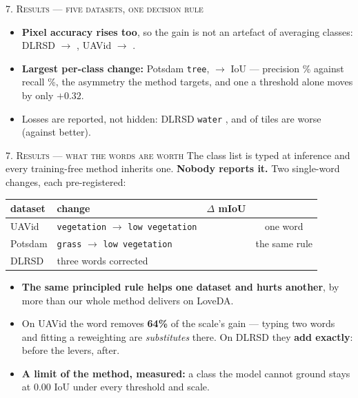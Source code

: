 \documentclass[aspectratio=169]{beamer}
\newcommand{\best}[1]{\textcolor{acc}{\textbf{#1}}}
\newcommand{\bad}[1]{\textcolor{warn}{#1}}
\begin{document}
\begin{frame}{\textsc{7. Results --- five datasets, one decision rule}}
\begin{itemize}
  \item \textbf{Pixel accuracy rises too}, so the gain is not an artefact of
        averaging classes: DLRSD \dlraAccA{} $\rightarrow$ \best{\dlraAccC{}},
        UAVid \uavaAccA{} $\rightarrow$ \best{\uavaAccC{}}.
  \item \textbf{Largest per-class change:} Potsdam \texttt{tree},
        \best{\treeIoUa{} $\rightarrow$ \treeIoUb{}} IoU --- precision \treeP{}\%
        against recall \treeR{}\%, the asymmetry the method targets, and one a
        threshold alone moves by only $+0.32$.
  \item \bad{Losses are reported, not hidden:} DLRSD \texttt{water}
        \bad{\dlrWaterLoss{}}, and \dlrTilesDown{} of \dlrTiles{} tiles are worse
        (against \dlrTilesUp{} better).
\end{itemize}
\end{frame}

\begin{frame}{\textsc{7. Results --- what the words are worth}}
\small
The class list is typed at inference and every training-free method inherits one.
\best{Nobody reports it.} Two single-word changes, each pre-registered:
\vspace{0.3em}
\begin{center}\footnotesize
\begin{tabular}{@{}llcc@{}}
\toprule
dataset & change & $\Delta$ mIoU & \\
\midrule
UAVid & \texttt{vegetation} $\rightarrow$ \texttt{low vegetation} & \best{\vocUavGain{}} & one word\\
Potsdam & \texttt{grass} $\rightarrow$ \texttt{low vegetation} & \bad{\vocPotsGain{}} & the same rule\\
DLRSD & three words corrected & \dlrVocBase{} & \\
\bottomrule
\end{tabular}
\end{center}
\vspace{0.4em}
\begin{itemize}\footnotesize
  \item \textbf{The same principled rule helps one dataset and hurts another},
        by more than our whole method delivers on LoveDA.
  \item On UAVid the word removes \best{64\%} of the scale's gain --- typing two
        words and fitting a reweighting are \emph{substitutes} there. On DLRSD
        they \best{add exactly}: \dlrVocBase{} before the levers,
        \dlrVocAfter{} after.
  \item \textbf{A limit of the method, measured:} a class the model cannot
        ground stays at 0.00 IoU under every threshold and scale.
\end{itemize}
\end{frame}
\end{document}
